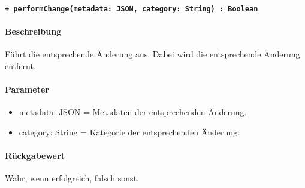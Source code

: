 \paragraph{\texttt{+ performChange(metadata: JSON, category: String) : Boolean}}\label{AP_Framework_performChange}%
\paragraph*{Beschreibung}
Führt die entsprechende Änderung aus.
Dabei wird die entsprechende Änderung entfernt.
\paragraph*{Parameter}
\begin{itemize}
    \item metadata: JSON = Metadaten der entsprechenden Änderung.
    \item category: String = Kategorie der entsprechenden Änderung.
\end{itemize}
\paragraph*{Rückgabewert}
Wahr, wenn erfolgreich, falsch sonst.
